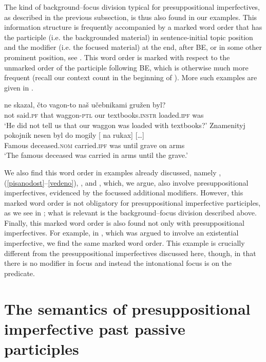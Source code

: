 \documentclass[output=paper,modfonts,newtxmath,hidelinks
]{langscibook}
\begin{document}
\noindent The kind of background--focus division typical for presuppositional imperfectives, as described in the previous subsection, is thus also found in our examples. This information structure is frequently accompanied by a marked word order that has the participle (i.e. the backgrounded material) in sentence-initial topic position and the modifier (i.e. the focused material) at the end, after BE, or in some other prominent position, see . This word order is marked with respect to the unmarked order of the participle following BE, which is otherwise much more frequent (recall our context count in the beginning of ). More such examples are given in .

\ea\label{presOF-WO}
\ea\gll	[...] ne skazal, čto vagon-to naš učebnikami gružen byl?\\
	{} not said.\textsc{pf} that waggon-\textsc{ptl} our textbooks.\textsc{instr} loaded.\textsc{ipf} was\\
\glt	`He did not tell us that our waggon was loaded with textbooks?'\label{textbooks}
\ex\gll Znamenityj pokojnik nesen byl do mogily {\hspace{60pt}} [\hspace{-2pt} na rukax] [\dots] \label{nesen} \\
	Famous deceased.\textsc{nom} carried.\textsc{ipf} was until grave {} {} on arms\\
\glt	`The famous deceased was carried in arms until the grave.'
\z\z

\noindent We also find this word order in examples already discussed, namely , (\ref{pisanodost}--\ref{vedeno}), , and , which, we argue, also involve presuppositional imperfectives, evidenced by the focussed additional modifiers. However, this marked word order is not obligatory for presuppositional imperfective participles, as we see in ; what is relevant is the background--focus division described above. Finally, this marked word order is also found not only with presuppositional imperfectives. For example, in , which was argued to involve an existential imperfective, we find the same marked word order. This example is crucially different from the presuppositional imperfectives discussed here, though, in that there is no modifier in focus and instead the intonational focus is on the predicate.

\section{The semantics of presuppositional imperfective past passive participles}
\label{analysis}
\end{document}
